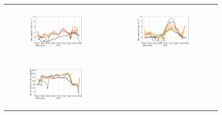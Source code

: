 \begin{figure}[hbtp]
\begin{tabular}{cc}
        \begin{subfigure}[t]{0.5\textwidth}
            \caption{}
            \includegraphics[width=\textwidth]{images/chap5/IOP_TS/TS_2021-07-15_elsplans_wind_speed_10m.png}
        \end{subfigure} &
        \begin{subfigure}[t]{0.5\textwidth}
            \caption{}
            \includegraphics[width=\textwidth]{images/chap5/IOP_TS/TS_2021-07-20_elsplans_wind_speed_10m.png}
        \end{subfigure} \\
        \begin{subfigure}[t]{0.5\textwidth}
            \caption{}
            \includegraphics[width=\textwidth]{images/chap5/IOP_TS/TS_2021-07-15_elsplans_wind_direction_10m.png}

\end{subfigure}
\end{tabular}
\end{figure}
